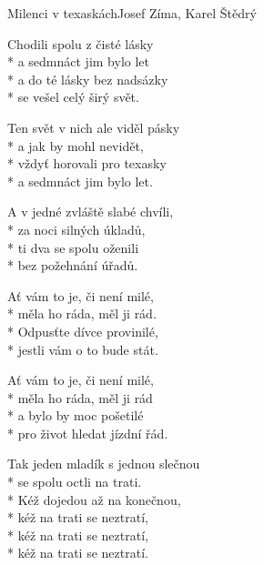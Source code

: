\documentclass[10.5pt]{book}
\begin{document}
\begin{poem}{Milenci v texaskách}{Josef Zíma, Karel Štědrý}

\settowidth{\versewidth}{Tak jeden mladík s jednou slečnou}

Chodili spolu z čisté lásky\\*
a sedmnáct jim bylo let\\*
a do té lásky bez nadsázky\\*
se vešel celý širý svět.

Ten svět v nich ale viděl pásky\\*
a jak by mohl nevidět,\\*
vždyť horovali pro texasky\\*
a sedmnáct jim bylo let.

A v jedné zvláště slabé chvíli,\\*
za noci silných úkladů,\\*
ti dva se spolu oženili\\*
bez požehnání úřadů.

Ať vám to je, či není milé,\\*
měla ho ráda, měl ji rád.\\*
Odpusťte dívce provinilé,\\*
jestli vám o to bude stát.

Ať vám to je, či není milé,\\*
měla ho ráda, měl ji rád\\*
a bylo by moc pošetilé\\*
pro život hledat jízdní řád.

Tak jeden mladík s jednou slečnou\\*
se spolu octli na trati.\\*
Kéž dojedou až na konečnou,\\*
kéž na trati se neztratí,\\*
kéž na trati se neztratí,\\*
kéž na trati se neztratí.

\end{poem}
\end{document}
